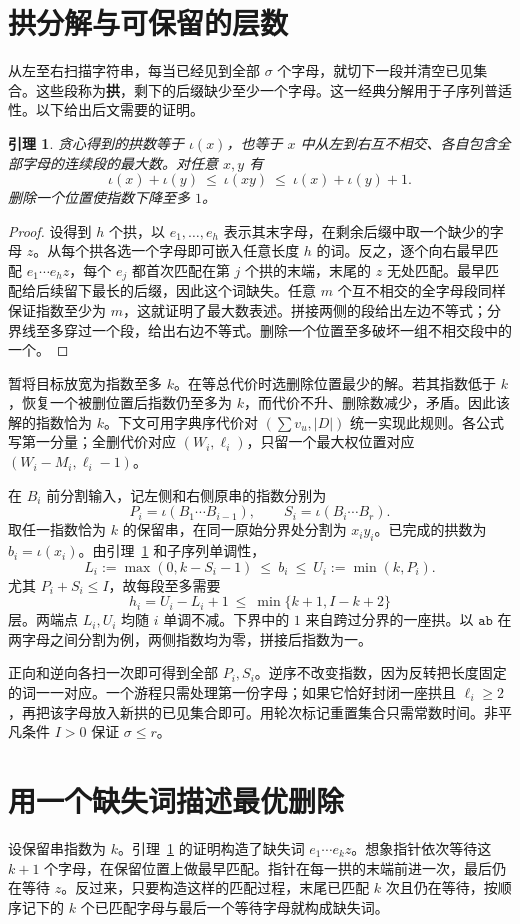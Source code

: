 \documentclass[UTF8,11pt,a4paper,fontset=fandol]{ctexart}
\theoremstyle{zh}
\newtheorem{lemma}[theorem]{引理}
\newcommand{\ind}{\iota}
\newcommand{\pagehead}[1]{\clearpage\section{#1}}
\begin{document}
\pagehead{拱分解与可保留的层数}
从左至右扫描字符串，每当已经见到全部 $\sigma$ 个字母，就切下一段并清空已见集合。这些段称为\textbf{拱}，剩下的后缀缺少至少一个字母。这一经典分解用于子序列普适性\cite{barker,day}。以下给出后文需要的证明。

\begin{lemma}\label{lem:arch}
贪心得到的拱数等于 $\ind(x)$，也等于 $x$ 中从左到右互不相交、各自包含全部字母的连续段的最大数。对任意 $x,y$ 有
\[
 \ind(x)+\ind(y)\ \le\ \ind(xy)\ \le\ \ind(x)+\ind(y)+1 .
\]
删除一个位置使指数下降至多 $1$。
\end{lemma}
\begin{proof}
设得到 $h$ 个拱，以 $e_1,\ldots,e_h$ 表示其末字母，在剩余后缀中取一个缺少的字母 $z$。从每个拱各选一个字母即可嵌入任意长度 $h$ 的词。反之，逐个向右最早匹配 $e_1\cdots e_hz$，每个 $e_j$ 都首次匹配在第 $j$ 个拱的末端，末尾的 $z$ 无处匹配。最早匹配给后续留下最长的后缀，因此这个词缺失。任意 $m$ 个互不相交的全字母段同样保证指数至少为 $m$，这就证明了最大数表述。拼接两侧的段给出左边不等式；分界线至多穿过一个段，给出右边不等式。删除一个位置至多破坏一组不相交段中的一个。
\end{proof}

暂将目标放宽为指数至多 $k$。在等总代价时选删除位置最少的解。若其指数低于 $k$，恢复一个被删位置后指数仍至多为 $k$，而代价不升、删除数减少，矛盾。因此该解的指数恰为 $k$。下文可用字典序代价对 $(\sum v_u,|D|)$ 统一实现此规则。各公式写第一分量；全删代价对应 $(W_i,\ell_i)$，只留一个最大权位置对应 $(W_i-M_i,\ell_i-1)$。

在 $B_i$ 前分割输入，记左侧和右侧原串的指数分别为
\[
 P_i=\ind(B_1\cdots B_{i-1}),\qquad S_i=\ind(B_i\cdots B_r).
\]
取任一指数恰为 $k$ 的保留串，在同一原始分界处分割为 $x_i y_i$。已完成的拱数为 $b_i=\ind(x_i)$。由引理~\ref{lem:arch} 和子序列单调性，
\begin{equation}
 L_i:=\max(0,k-S_i-1)\ \le\ b_i\ \le\ U_i:=\min(k,P_i).
 \label{eq:band}
\end{equation}
尤其 $P_i+S_i\le I$，故每段至多需要
\[
 h_i=U_i-L_i+1\ \le\ \min\{k+1,I-k+2\}
\]
层。两端点 $L_i,U_i$ 均随 $i$ 单调不减。下界中的 $1$ 来自跨过分界的一座拱。以 $\mathtt{ab}$ 在两字母之间分割为例，两侧指数均为零，拼接后指数为一。

正向和逆向各扫一次即可得到全部 $P_i,S_i$。逆序不改变指数，因为反转把长度固定的词一一对应。一个游程只需处理第一份字母；如果它恰好封闭一座拱且 $\ell_i\ge2$，再把该字母放入新拱的已见集合即可。用轮次标记重置集合只需常数时间。非平凡条件 $I>0$ 保证 $\sigma\le r$。

\pagehead{用一个缺失词描述最优删除}
设保留串指数为 $k$。引理~\ref{lem:arch} 的证明构造了缺失词 $e_1\cdots e_kz$。想象指针依次等待这 $k+1$ 个字母，在保留位置上做最早匹配。指针在每一拱的末端前进一次，最后仍在等待 $z$。反过来，只要构造这样的匹配过程，末尾已匹配 $k$ 次且仍在等待，按顺序记下的 $k$ 个已匹配字母与最后一个等待字母就构成缺失词。
\end{document}
